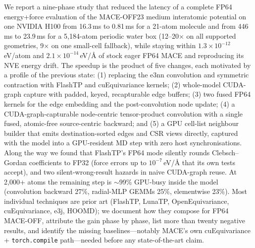 We report a nine-phase study that reduced the latency of a complete FP64 energy+force evaluation of the MACE-OFF23 medium interatomic potential on one NVIDIA H100 from 16.3\,ms to 0.81\,ms for a 21-atom molecule and from 446\,ms to 23.9\,ms for a 5{,}184-atom periodic water box (12--20$\times$ on all supported geometries, 9$\times$ on one small-cell fallback), while staying within $1.3\times10^{-12}$\,eV/atom and $2.1\times10^{-14}$\,eV/\AA{} of stock eager FP64 MACE and reproducing its NVE energy drift. The speedup is the product of five changes, each motivated by a profile of the previous state: (1) replacing the e3nn convolution and symmetric contraction with FlashTP and cuEquivariance kernels; (2) whole-model CUDA-graph capture with padded, keyed, recapturable edge buffers; (3) two fused FP64 kernels for the edge embedding and the post-convolution node update; (4) a CUDA-graph-capturable node-centric tensor-product convolution with a single fused, atomic-free source-centric backward; and (5) a GPU cell-list neighbour builder that emits destination-sorted edges and CSR views directly, captured with the model into a GPU-resident MD step with zero host synchronisations. Along the way we found that FlashTP's FP64 mode silently rounds Clebsch--Gordan coefficients to FP32 (force errors up to $10^{-7}$\,eV/\AA{} that its own tests accept), and two silent-wrong-result hazards in naive CUDA-graph reuse. At 2{,}000+ atoms the remaining step is $\sim$99\% GPU-busy inside the model (convolution backward 27\%, radial-MLP GEMMs 25\%, elementwise 23\%). Most individual techniques are prior art (FlashTP, LunaTP, OpenEquivariance, cuEquivariance, e3j, HOOMD); we document how they compose for FP64 MACE-OFF, attribute the gain phase by phase, list more than twenty negative results, and identify the missing baselines---notably MACE's own cuEquivariance + \texttt{torch.compile} path---needed before any state-of-the-art claim.
